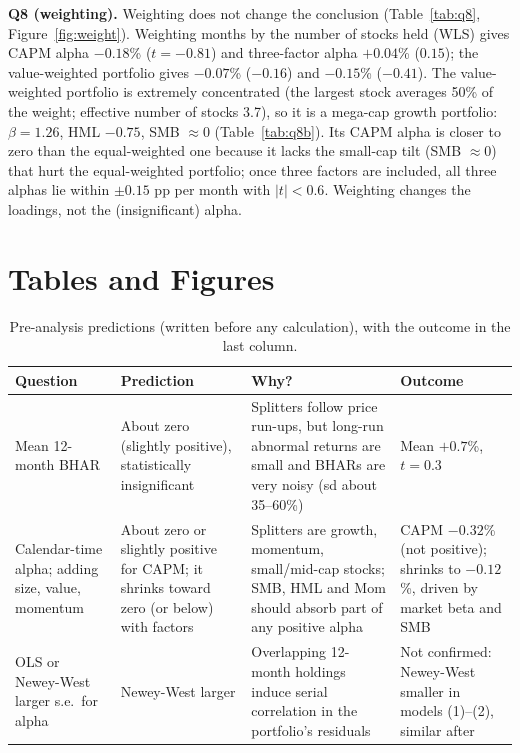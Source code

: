 \documentclass[10pt]{article}
\begin{document}
\medskip
\noindent\textbf{Q8 (weighting).} Weighting does not change the conclusion (Table~\ref{tab:q8}, Figure~\ref{fig:weight}). Weighting months by the number of stocks held (WLS) gives CAPM alpha $-0.18$\% ($t=-0.81$) and three-factor alpha $+0.04$\% ($0.15$); the value-weighted portfolio gives $-0.07$\% ($-0.16$) and $-0.15$\% ($-0.41$). The value-weighted portfolio is extremely concentrated (the largest stock averages 50\% of the weight; effective number of stocks 3.7), so it is a mega-cap growth portfolio: $\beta=1.26$, HML $-0.75$, SMB $\approx 0$ (Table~\ref{tab:q8b}). Its CAPM alpha is closer to zero than the equal-weighted one because it lacks the small-cap tilt (SMB $\approx 0$) that hurt the equal-weighted portfolio; once three factors are included, all three alphas lie within $\pm0.15$ pp per month with $|t|<0.6$. Weighting changes the loadings, not the (insignificant) alpha.

\clearpage
\section*{Tables and Figures}

\begin{table}[!htbp]
\caption{Pre-analysis predictions (written before any calculation), with the outcome in the last column.}
\label{tab:pred}
\begin{tabular}{p{4.0cm}p{3.6cm}p{4.2cm}p{3.2cm}}
\toprule
Question & Prediction & Why? & Outcome \\
\midrule
Mean 12-month BHAR & About zero (slightly positive), statistically insignificant & Splitters follow price run-ups, but long-run abnormal returns are small and BHARs are very noisy (sd about 35--60\%) & Mean $+0.7$\%, $t=0.3$ \\
Calendar-time alpha; adding size, value, momentum & About zero or slightly positive for CAPM; it shrinks toward zero (or below) with factors & Splitters are growth, momentum, small/mid-cap stocks; SMB, HML and Mom should absorb part of any positive alpha & CAPM $-0.32$\% (not positive); shrinks to $-0.12$\%, driven by market beta and SMB \\
OLS or Newey-West larger s.e.\ for alpha & Newey-West larger & Overlapping 12-month holdings induce serial correlation in the portfolio's residuals & Not confirmed: Newey-West smaller in models (1)--(2), similar after \\
\bottomrule
\end{tabular}
\end{table}
\end{document}
